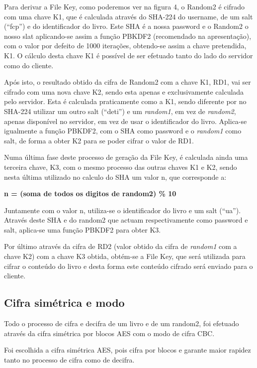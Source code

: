 \documentclass[pdftex,12pt,a4paper]{report}
\begin{document}
Para derivar a File Key, como poderemos ver na figura 4, o Random2 é cifrado com uma chave K1, que é calculada através do SHA-224 do username, de um salt (“fcp”) e do identificador do livro. Este SHA é a nossa password e o Random2 o nosso slat aplicando-se assim a função PBKDF2 (recomendado na apresentação), com o valor por defeito de 1000 iterações, obtendo-se assim a chave pretendida, K1. O cálculo desta chave K1 é possível de ser efetuado tanto do lado do servidor como do cliente.

Após isto, o resultado obtido da cifra de Random2 com a chave K1, RD1, vai ser cifrado com uma nova chave K2, sendo esta apenas e exclusivamente calculada pelo servidor. Esta é calculada praticamente como a K1, sendo diferente por no SHA-224 utilizar um outro salt (“deti”) e um \textit{random1}, em vez de \textit{random2}, apenas disponível no servidor, em vez de usar o identificador do livro. Aplica-se igualmente a função PBKDF2, com o SHA como password e o \textit{random1} como salt, de forma a obter K2 para se poder cifrar o valor de RD1.

Numa última fase deste processo de geração da File Key, é calculada ainda uma terceira chave, K3, com o mesmo processo das outras chaves K1 e K2, sendo nesta última utilizado no calculo do SHA um valor n, que corresponde a:

\begin{center}
	\textbf{n = (soma de todos os digitos de random2) \% 10}
\end{center}

Juntamente com o valor n, utiliza-se o identificador do livro e um salt (“ua”). Através deste SHA e do random2 que actuam respectivamente como password e salt, aplica-se uma função PBKDF2 para obter K3.

Por último através da cifra de RD2 (valor obtido da cifra de \textit{random1} com a chave K2) com a chave K3 obtida, obtém-se a File Key, que será utilizada para cifrar o conteúdo do livro e desta forma este conteúdo cifrado será enviado para o cliente.

\subsection{Cifra simétrica e modo}

Todo o processo de cifra e decifra de um livro e de um random2, foi efetuado através da cifra simétrica por blocos AES com o modo de cifra CBC.

Foi escolhida a cifra simétrica AES, pois cifra por blocos e garante maior rapidez tanto no processo de cifra como de decifra.
	
\end{document}
